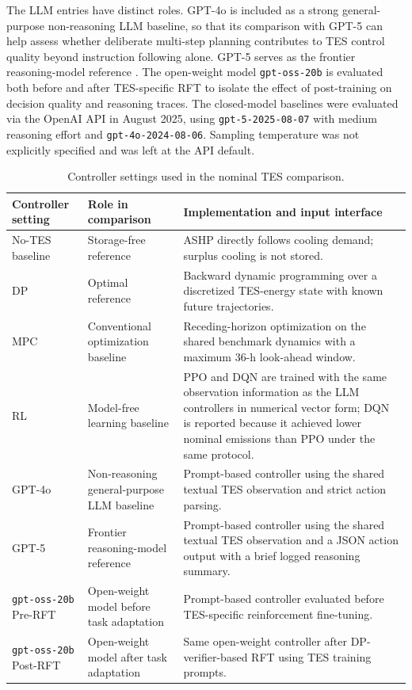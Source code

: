 \documentclass[11pt]{article}
\begin{document}
The LLM entries have distinct roles. GPT-4o is included as a strong general-purpose non-reasoning LLM baseline, so that its comparison with GPT-5 can help assess whether deliberate multi-step planning contributes to TES control quality beyond instruction following alone. GPT-5 serves as the frontier reasoning-model reference \cite{ref:gpt5_system_card}. The open-weight model \texttt{gpt-oss-20b} is evaluated both before and after TES-specific RFT to isolate the effect of post-training on decision quality and reasoning traces. The closed-model baselines were evaluated via the OpenAI API in August 2025, using \texttt{gpt-5-2025-08-07} with medium reasoning effort and \texttt{gpt-4o-2024-08-06}. Sampling temperature was not explicitly specified and was left at the API default.

\begin{table}[t]
\centering
\caption{Controller settings used in the nominal TES comparison.}
\label{tab:tes_controller_settings}
\small
\begin{tabular}{p{}p{}p{}}
\toprule
Controller setting & Role in comparison & Implementation and input interface \\
\midrule
No-TES baseline & Storage-free reference & ASHP directly follows cooling demand; surplus cooling is not stored. \\
DP & Optimal reference & Backward dynamic programming over a discretized TES-energy state with known future trajectories. \\
MPC & Conventional optimization baseline & Receding-horizon optimization on the shared benchmark dynamics with a maximum 36-h look-ahead window. \\
RL & Model-free learning baseline & PPO and DQN are trained with the same observation information as the LLM controllers in numerical vector form; DQN is reported because it achieved lower nominal emissions than PPO under the same protocol. \\
GPT-4o & Non-reasoning general-purpose LLM baseline & Prompt-based controller using the shared textual TES observation and strict action parsing. \\
GPT-5 & Frontier reasoning-model reference & Prompt-based controller using the shared textual TES observation and a JSON action output with a brief logged reasoning summary. \\
\texttt{gpt-oss-20b} Pre-RFT & Open-weight model before task adaptation & Prompt-based controller evaluated before TES-specific reinforcement fine-tuning. \\
\texttt{gpt-oss-20b} Post-RFT & Open-weight model after task adaptation & Same open-weight controller after DP-verifier-based RFT using TES training prompts. \\
\bottomrule
\end{tabular}
\end{table}
\end{document}
